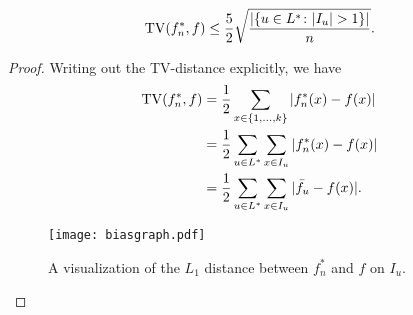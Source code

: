 \begin{prop}
  \[
    \operatorname{TV}(f^*_n, f) \le \frac{5}{2} \sqrt{\frac{|\{u \in L^* \colon |I_u| > 1\} |}{n}} .
  \]
\end{prop}
\begin{proof}
  Writing out the TV-distance explicitly, we have
  \begin{align*}
    \TV(f^*_n, f) &= \frac{1}{2} \sum_{x \in \{1, \dots, k\}} |f^*_n(x) - f(x)| \\
                  &= \frac{1}{2} \sum_{u \in L^*} \sum_{x \in I_u} |f^*_n(x) - f(x)| \\
                  &= \frac{1}{2} \sum_{u \in L^*} \sum_{x \in I_u} | \bar{f}_u - f(x) | .
  \end{align*}
  \begin{figure} 
    \centering
    \texttt{[image: biasgraph.pdf]}
    \caption{A visualization of the $L_1$ distance between $f^*_n$ and
      $f$ on $I_u$.}
  \end{figure}
  

\end{proof}
